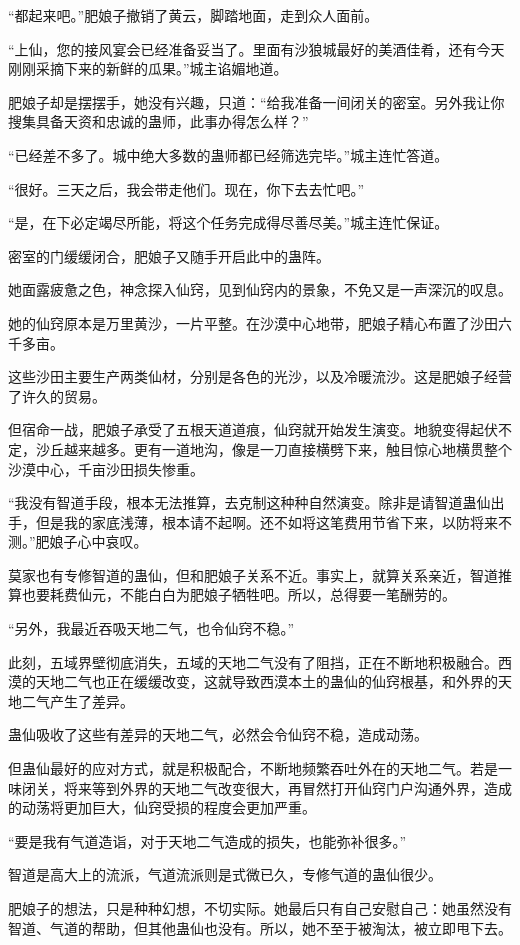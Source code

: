 \begin{this_body}
“都起来吧。”肥娘子撤销了黄云，脚踏地面，走到众人面前。

“上仙，您的接风宴会已经准备妥当了。里面有沙狼城最好的美酒佳肴，还有今天刚刚采摘下来的新鲜的瓜果。”城主谄媚地道。

肥娘子却是摆摆手，她没有兴趣，只道：“给我准备一间闭关的密室。另外我让你搜集具备天资和忠诚的蛊师，此事办得怎么样？”

“已经差不多了。城中绝大多数的蛊师都已经筛选完毕。”城主连忙答道。

“很好。三天之后，我会带走他们。现在，你下去去忙吧。”

“是，在下必定竭尽所能，将这个任务完成得尽善尽美。”城主连忙保证。

密室的门缓缓闭合，肥娘子又随手开启此中的蛊阵。

她面露疲惫之色，神念探入仙窍，见到仙窍内的景象，不免又是一声深沉的叹息。

她的仙窍原本是万里黄沙，一片平整。在沙漠中心地带，肥娘子精心布置了沙田六千多亩。

这些沙田主要生产两类仙材，分别是各色的光沙，以及冷暖流沙。这是肥娘子经营了许久的贸易。

但宿命一战，肥娘子承受了五根天道道痕，仙窍就开始发生演变。地貌变得起伏不定，沙丘越来越多。更有一道地沟，像是一刀直接横劈下来，触目惊心地横贯整个沙漠中心，千亩沙田损失惨重。

“我没有智道手段，根本无法推算，去克制这种种自然演变。除非是请智道蛊仙出手，但是我的家底浅薄，根本请不起啊。还不如将这笔费用节省下来，以防将来不测。”肥娘子心中哀叹。

莫家也有专修智道的蛊仙，但和肥娘子关系不近。事实上，就算关系亲近，智道推算也要耗费仙元，不能白白为肥娘子牺牲吧。所以，总得要一笔酬劳的。

“另外，我最近吞吸天地二气，也令仙窍不稳。”

此刻，五域界壁彻底消失，五域的天地二气没有了阻挡，正在不断地积极融合。西漠的天地二气也正在缓缓改变，这就导致西漠本土的蛊仙的仙窍根基，和外界的天地二气产生了差异。

蛊仙吸收了这些有差异的天地二气，必然会令仙窍不稳，造成动荡。

但蛊仙最好的应对方式，就是积极配合，不断地频繁吞吐外在的天地二气。若是一味闭关，将来等到外界的天地二气改变很大，再冒然打开仙窍门户沟通外界，造成的动荡将更加巨大，仙窍受损的程度会更加严重。

“要是我有气道造诣，对于天地二气造成的损失，也能弥补很多。”

智道是高大上的流派，气道流派则是式微已久，专修气道的蛊仙很少。

肥娘子的想法，只是种种幻想，不切实际。她最后只有自己安慰自己：她虽然没有智道、气道的帮助，但其他蛊仙也没有。所以，她不至于被淘汰，被立即甩下去。


\end{this_body}
